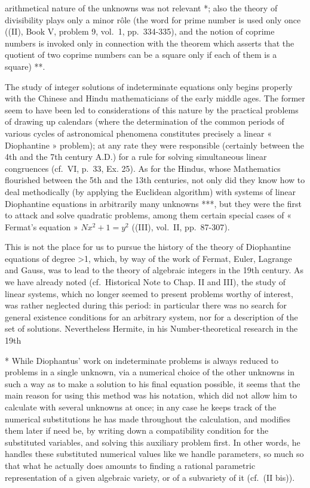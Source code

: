 arithmetical nature of the unknowns was not relevant *; also the theory of divisibility plays only a minor rôle (the word for prime number is used only once ((II), Book V, problem 9, vol.~1, pp.~334-335), and the notion of coprime numbers is invoked only in connection with the theorem which asserts that the quotient of two coprime numbers can be a square only if each of them is a square) **.

The study of integer solutions of indeterminate equations only begins properly with the Chinese and Hindu mathematicians of the early middle ages. The former seem to have been led to considerations of this nature by the practical problems of drawing up calendars (where the determination of the common periods of various cycles of astronomical phenomena constitutes precisely a linear « Diophantine » problem); at any rate they were responsible (certainly between the 4th and the 7th century A.D.) for a rule for solving simultaneous linear congruences (cf.~VI, p.~33, Ex. 25). As for the Hindus, whose Mathematics flourished between the 5th and the 13th centuries, not only did they know how to deal methodically (by applying the Euclidean algorithm) with systems of linear Diophantine equations in arbitrarily many unknowns ***, but they were the first to attack and solve quadratic problems, among them certain special cases of « Fermat's equation » \(Nx^{2} + 1 = y^{2}\) ((III), vol.~II, pp.~87-307).

This is not the place for us to pursue the history of the theory of Diophantine equations of degree \textgreater1, which, by way of the work of Fermat, Euler, Lagrange and Gauss, was to lead to the theory of algebraic integers in the 19th century. As we have already noted (cf.~Historical Note to Chap. II and III), the study of linear systems, which no longer seemed to present problems worthy of interest, was rather neglected during this period: in particular there was no search for general existence conditions for an arbitrary system, nor for a description of the set of solutions. Nevertheless Hermite, in his Number-theoretical research in the 19th

* While Diophantus' work on indeterminate problems is always reduced to problems in a single unknown, via a numerical choice of the other unknowns in such a way as to make a solution to his final equation possible, it seems that the main reason for using this method was his notation, which did not allow him to calculate with several unknowns at once; in any case he keeps track of the numerical substitutions he has made throughout the calculation, and modifies them later if need be, by writing down a compatibility condition for the substituted variables, and solving this auxiliary problem first. In other words, he handles these substituted numerical values like we handle parameters, so much so that what he actually does amounts to finding a rational parametric representation of a given algebraic variety, or of a subvariety of it (cf.~(II bis)).

